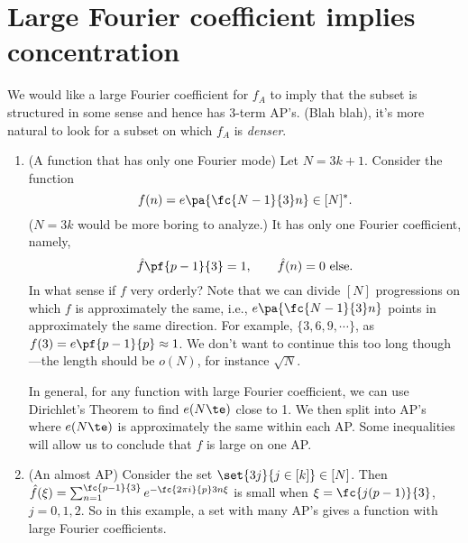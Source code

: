 \section{Large Fourier coefficient implies concentration}
We would like a large Fourier coefficient for $f_A$ to imply that the subset is structured in some sense and hence has 3-term AP's. (Blah blah), it's more natural to look for a subset on which $f_A$ is {\it denser}.

\begin{ex}
\begin{enumerate}
\item (A function that has only one Fourier mode) Let $N=3k+1$.  Consider the function
\[
f(n)=e\pa{\fc{N-1}{3}n}\in [N]^*.
\]
($N=3k$ would be more boring to analyze.)
It has only one Fourier coefficient, namely,
\[
\hat f\pf{p-1}{3}=1,\qquad \hat f(n)=0\text{ else}.
\]
In what sense if $f$ very orderly? Note that we can divide $[N]$ progressions on which $f$ is approximately the same, i.e., $e\pa{\fc{N-1}{3}n}$ points in approximately the same direction. For example, $\{3,6,9,\cdots\}$, as $f(3)=e\pf{p-1}{p}\approx 1$. We don't want to continue this too long though---the length should be $o(N)$, for instance $\sqrt N$. 

In general, for any function with large Fourier coefficient, we can use Dirichlet's Theorem to find $e(N\te)$ close to 1. We then split into AP's where $e(N\te)$ is approximately the same within each AP. Some inequalities will allow us to conclude that $f$ is large on one AP.
\item (An almost AP) Consider the set $\set{3j}{j\in [k]}\in [N]$. Then $\hat f(\xi)=\sum_{n=1}^{\fc{p-1}{3}} e^{-\fc{2\pi i}{p}3n\xi}$ is small when $\xi=\fc{j(p-1)}{3}$, $j=0,1,2$. So in this example, a set with many AP's gives a function with large Fourier coefficients.
\end{enumerate}
\end{ex}


